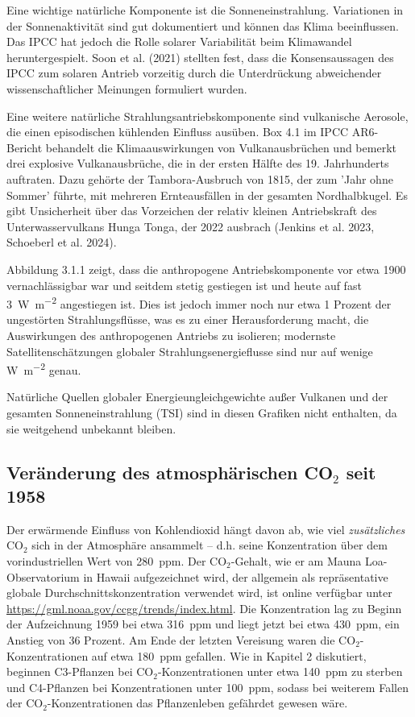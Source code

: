 \documentclass[12pt,paper=a4,DIV=12,parskip=never,chapterprefix=false,headings=standardclasses]{scrreprt}
\begin{document}
Eine wichtige natürliche Komponente ist die Sonneneinstrahlung. Variationen in der Sonnenaktivität sind gut dokumentiert und können das Klima beeinflussen. Das IPCC hat jedoch die Rolle solarer Variabilität beim Klimawandel heruntergespielt. Soon et al. (2021) stellten fest, dass die Konsensaussagen des IPCC zum solaren Antrieb vorzeitig durch die Unterdrückung abweichender wissenschaftlicher Meinungen formuliert wurden.

Eine weitere natürliche Strahlungsantriebskomponente sind vulkanische Aerosole, die einen episodischen kühlenden Einfluss ausüben. Box 4.1 im IPCC AR6-Bericht behandelt die Klimaauswirkungen von Vulkanausbrüchen und bemerkt drei explosive Vulkanausbrüche, die in der ersten Hälfte des 19. Jahrhunderts auftraten. Dazu gehörte der Tambora-Ausbruch von 1815, der zum 'Jahr ohne Sommer' führte, mit mehreren Ernteausfällen in der gesamten Nordhalbkugel. Es gibt Unsicherheit über das Vorzeichen der relativ kleinen Antriebskraft des Unterwasservulkans Hunga Tonga, der 2022 ausbrach (Jenkins et al. 2023, Schoeberl et al. 2024).

Abbildung 3.1.1 zeigt, dass die anthropogene Antriebskomponente vor etwa 1900 vernachlässigbar war und seitdem stetig gestiegen ist und heute auf fast \SI{3}{\watt\per\square\meter} angestiegen ist. Dies ist jedoch immer noch nur etwa 1 Prozent der ungestörten Strahlungsflüsse, was es zu einer Herausforderung macht, die Auswirkungen des anthropogenen Antriebs zu isolieren; modernste Satellitenschätzungen globaler Strahlungsenergieflusse sind nur auf wenige \si{\watt\per\square\meter} genau.

Natürliche Quellen globaler Energieungleichgewichte außer Vulkanen und der gesamten Sonneneinstrahlung (TSI) sind in diesen Grafiken nicht enthalten, da sie weitgehend unbekannt bleiben.

\subsection{Veränderung des atmosphärischen CO$_2$ seit 1958}

Der erwärmende Einfluss von Kohlendioxid hängt davon ab, wie viel \emph{zusätzliches} CO$_2$ sich in der Atmosphäre ansammelt – d.h. seine Konzentration über dem vorindustriellen Wert von \SI{280}{ppm}. Der CO$_2$-Gehalt, wie er am Mauna Loa-Observatorium in Hawaii aufgezeichnet wird, der allgemein als repräsentative globale Durchschnittskonzentration verwendet wird, ist online verfügbar unter \url{https://gml.noaa.gov/ccgg/trends/index.html}. Die Konzentration lag zu Beginn der Aufzeichnung 1959 bei etwa \SI{316}{ppm} und liegt jetzt bei etwa \SI{430}{ppm}, ein Anstieg von 36 Prozent. Am Ende der letzten Vereisung waren die CO$_2$-Konzentrationen auf etwa \SI{180}{ppm} gefallen. Wie in Kapitel 2 diskutiert, beginnen C3-Pflanzen bei CO$_2$-Konzentrationen unter etwa \SI{140}{ppm} zu sterben und C4-Pflanzen bei Konzentrationen unter \SI{100}{ppm}, sodass bei weiterem Fallen der CO$_2$-Konzentrationen das Pflanzenleben gefährdet gewesen wäre.
\end{document}
